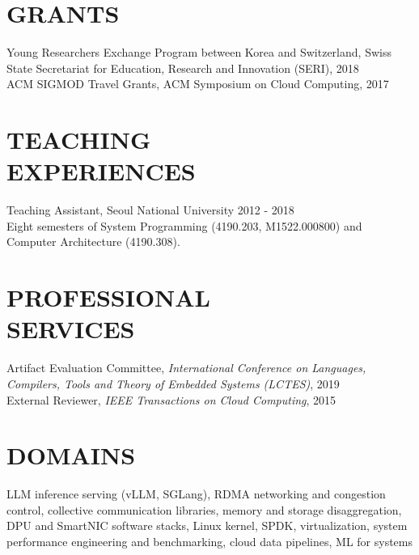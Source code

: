 \documentclass[margin]{res}
\begin{document}
\begin{resume}
\section{GRANTS}
\par
Young Researchers Exchange Program between Korea and Switzerland, Swiss State Secretariat for Education, Research and Innovation (SERI), 2018 \\

\vspace{-1.8em}
ACM SIGMOD Travel Grants, ACM Symposium on Cloud Computing, 2017


\vspace{-0.2em}
\section{TEACHING \\ EXPERIENCES}
\par
Teaching Assistant, Seoul National University \hfill 2012 - 2018 \\
Eight semesters of System Programming (4190.203, M1522.000800) and Computer
Architecture (4190.308).

\vspace{-0.4em}
\section{PROFESSIONAL \\ SERVICES}
\par
Artifact Evaluation Committee, \textit{International Conference on Languages, Compilers, Tools and Theory of Embedded Systems (LCTES)}, 2019 \\

\vspace{-1.8em}
External Reviewer, \textit{IEEE Transactions on Cloud Computing}, 2015 \\

\vspace{-1.5em}
\section{DOMAINS}
\par
LLM inference serving (vLLM, SGLang), RDMA networking and congestion control,
collective communication libraries,
memory and storage disaggregation, DPU and SmartNIC software stacks, Linux
kernel, SPDK, virtualization, system performance engineering and benchmarking,
cloud data pipelines, ML for systems

\end{resume}
\end{document}
